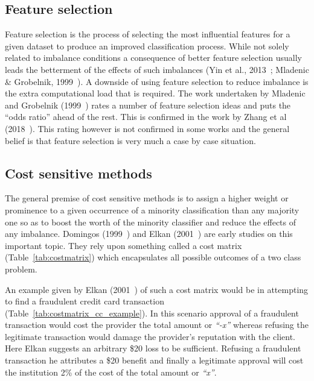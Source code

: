 \subsection{Feature selection}
Feature selection is the process of selecting the most influential features for a given dataset to produce an improved classification process. While not solely related to imbalance conditions a consequence of better feature selection usually leads the betterment of the effects of such imbalances (Yin et al., 2013~\cite{yin2013feature}; Mladenic \& Grobelnik, 1999~\cite{mladenic1999feature}). A downside of using feature selection to reduce imbalance is the extra computational load that is required. The work undertaken by Mladenic and Grobelnik (1999~\cite{mladenic1999feature}) rates a number of feature selection ideas and puts the ``odds ratio'' ahead of the rest. This is confirmed in the work by Zhang et al (2018~\cite{zhang2018image}). This rating however is not confirmed in some works and the general belief is that feature selection is very much a case by case situation.

\subsection{Cost sensitive methods}
The general premise of cost sensitive methods is to assign a higher weight or prominence to a given occurrence of a minority classification than any majority one so as to boost the worth of the minority classifier and reduce the effects of any imbalance. Domingos (1999~\cite{domingos1999metacost}) and Elkan (2001~\cite{elkan2001foundations}) are early studies on this important topic. They rely upon something called a cost matrix (Table~\ref{tab:costmatrix}) which encapsulates all possible outcomes of a two class problem.


 
An example given by Elkan (2001~\cite{elkan2001foundations}) of such a cost matrix would be in attempting to find a fraudulent credit card transaction (Table~\ref{tab:costmatrix_cc_example}). In this scenario approval of a fraudulent transaction would cost the provider the total amount or \textit{``-x''} whereas refusing the legitimate transaction would damage the provider's reputation with the client. Here Elkan suggests an arbitrary \$20 loss to be sufficient. Refusing a fraudulent transaction he attributes a \$20 benefit and finally a legitimate approval will cost the institution 2\% of the cost of the total amount or \textit{``x''}.

